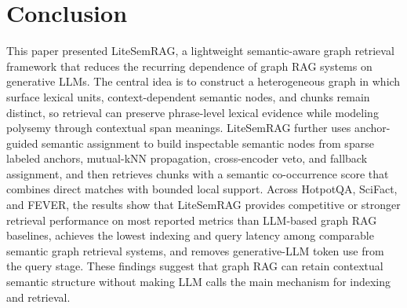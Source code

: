 \documentclass[conference]{IEEEtran}
\begin{document}
\section{Conclusion}
This paper presented LiteSemRAG, a lightweight semantic-aware graph retrieval framework that reduces the recurring dependence of graph RAG systems on generative LLMs. The central idea is to construct a heterogeneous graph in which surface lexical units, context-dependent semantic nodes, and chunks remain distinct, so retrieval can preserve phrase-level lexical evidence while modeling polysemy through contextual span meanings. LiteSemRAG further uses anchor-guided semantic assignment to build inspectable semantic nodes from sparse labeled anchors, mutual-kNN propagation, cross-encoder veto, and fallback assignment, and then retrieves chunks with a semantic co-occurrence score that combines direct matches with bounded local support. Across HotpotQA, SciFact, and FEVER, the results show that LiteSemRAG provides competitive or stronger retrieval performance on most reported metrics than LLM-based graph RAG baselines, achieves the lowest indexing and query latency among comparable semantic graph retrieval systems, and removes generative-LLM token use from the query stage. These findings suggest that graph RAG can retain contextual semantic structure without making LLM calls the main mechanism for indexing and retrieval.

%
%
%


\end{document}
